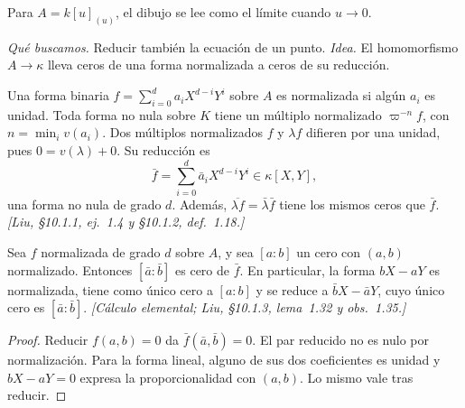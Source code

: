 \begin{center}
\end{center}
Para $A=k[u]_{(u)}$, el dibujo se lee como el límite cuando $u\to0$.

\emph{Qué buscamos.} Reducir también la ecuación de un punto. \emph{Idea.} El homomorfismo $A\to\kappa$ lleva ceros de una forma normalizada a ceros de su reducción.

\begin{defi}
\label{defi:s09-reduccion-forma}
Una forma binaria $f=\sum_{i=0}^da_iX^{d-i}Y^i$ sobre $A$ es normalizada si algún $a_i$ es unidad. Toda forma no nula sobre $K$ tiene un múltiplo normalizado $\varpi^{-n}f$, con $n=\min_i v(a_i)$. Dos múltiplos normalizados $f$ y $\lambda f$ difieren por una unidad, pues $0=v(\lambda)+0$. Su reducción es
\[
\bar f=\sum_{i=0}^d\bar a_iX^{d-i}Y^i\in\kappa[X,Y],
\]
una forma no nula de grado $d$. Además, $\overline{\lambda f}=\bar\lambda\bar f$ tiene los mismos ceros que $\bar f$. \emph{[Liu, \S10.1.1, ej.~1.4 y \S10.1.2, def.~1.18.]}
\end{defi}

\begin{prop}
\label{prop:s09-reduccion-ceros}
Sea $f$ normalizada de grado $d$ sobre $A$, y sea $[a:b]$ un cero con $(a,b)$ normalizado. Entonces $[\bar a:\bar b]$ es cero de $\bar f$. En particular, la forma $bX-aY$ es normalizada, tiene como único cero a $[a:b]$ y se reduce a $\bar bX-\bar aY$, cuyo único cero es $[\bar a:\bar b]$. \emph{[Cálculo elemental; Liu, \S10.1.3, lema~1.32 y obs.~1.35.]}
\end{prop}
\begin{proof}
Reducir $f(a,b)=0$ da $\bar f(\bar a,\bar b)=0$. El par reducido no es nulo por normalización. Para la forma lineal, alguno de sus dos coeficientes es unidad y $bX-aY=0$ expresa la proporcionalidad con $(a,b)$. Lo mismo vale tras reducir.
\end{proof}

